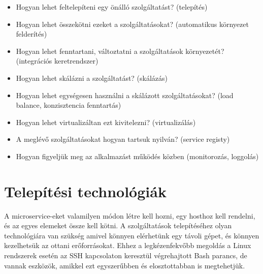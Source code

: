 \documentclass[11pt,magyar,a4paper,oneside,]{report}
\providecommand{\tightlist}{%
  \setlength{\itemsep}{0pt}\setlength{\parskip}{0pt}}
\begin{document}
\begin{itemize}
\tightlist
\item
  Hogyan lehet feltelepíteni egy önálló szolgáltatást? (telepítés)
\item
  Hogyan lehet összekötni ezeket a szolgáltatásokat? (automatikus
  környezet felderítés)
\item
  Hogyan lehet fenntartani, változtatni a szolgáltatások környezetét?
  (integrációs keretrendszer)
\item
  Hogyan lehet skálázni a szolgáltatást? (skálázás)
\item
  Hogyan lehet egységesen használni a skálázott szolgáltatásokat? (load
  balance, konzisztencia fenntartás)
\item
  Hogyan lehet virtualizáltan ezt kivitelezni? (virtualizálás)
\item
  A meglévő szolgáltatásokat hogyan tartsuk nyilván? (service registy)
\item
  Hogyan figyeljük meg az alkalmazást működés közben (monitorozás,
  loggolás)
\end{itemize}

\section{Telepítési
technológiák}\label{telepuxedtuxe9si-technoluxf3giuxe1k}

A microservice-eket valamilyen módon létre kell hozni, egy hosthoz kell
rendelni, és az egyes elemeket össze kell kötni. A szolgáltatások
telepítéséhez olyan technológiára van szükség amivel könnyen elérhetünk
egy távoli gépet, és könnyen kezelhetsük az ottani erőforrásokat. Ehhez
a legkézenfekvőbb megoldás a Linux rendszerek esetén az SSH kapcsolaton
keresztül végrehajtott Bash parancs, de vannak eszközök, amikkel ezt
egyszerűbben és elosztottabban is megtehetjük.
\end{document}
